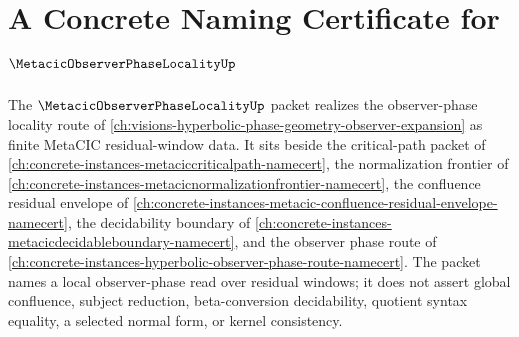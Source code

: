 \chapter{A Concrete Naming Certificate for $\MetacicObserverPhaseLocalityUp$}
\label{ch:concrete-instances-metacic-observer-phase-locality-namecert}

The $\MetacicObserverPhaseLocalityUp$ packet realizes the observer-phase locality route of \autoref{ch:visions-hyperbolic-phase-geometry-observer-expansion} as finite MetaCIC residual-window data. It sits beside the critical-path packet of \autoref{ch:concrete-instances-metaciccriticalpath-namecert}, the normalization frontier of \autoref{ch:concrete-instances-metacicnormalizationfrontier-namecert}, the confluence residual envelope of \autoref{ch:concrete-instances-metacic-confluence-residual-envelope-namecert}, the decidability boundary of \autoref{ch:concrete-instances-metacicdecidableboundary-namecert}, and the observer phase route of \autoref{ch:concrete-instances-hyperbolic-observer-phase-route-namecert}. The packet names a local observer-phase read over residual windows; it does not assert global confluence, subject reduction, beta-conversion decidability, quotient syntax equality, a selected normal form, or kernel consistency.

